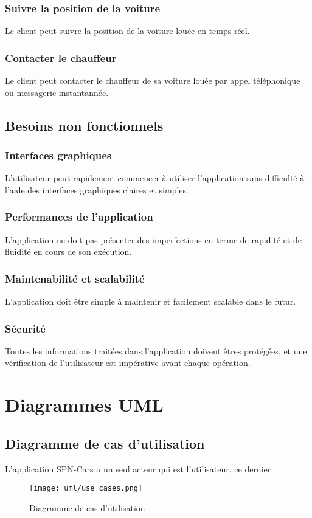 \subsubsection{Suivre la position de la voiture}
Le client peut suivre la position de la voiture louée en temps réel.
\subsubsection{Contacter le chauffeur}
Le client peut contacter le chauffeur de sa voiture louée par appel téléphonique ou messagerie instantannée.
\subsection{Besoins non fonctionnels}
\subsubsection{Interfaces graphiques}
L'utilisateur peut rapidement commencer à utiliser l'application sans difficulté à l'aide des interfaces graphiques claires et simples.
\subsubsection{Performances de l'application}
L'application ne doit pas présenter des imperfections en terme de rapidité et de fluidité en cours de son exécution.
\subsubsection{Maintenabilité et scalabilité}
L'application doit être simple à maintenir et facilement scalable dans le futur.
\subsubsection{Sécurité}
Toutes les informations traitées dans l'application doivent êtres protégées, et une vérification de l'utilisateur est impérative avant chaque opération.
\section{Diagrammes UML}
\subsection{Diagramme de cas d'utilisation}
L'application SPN-Cars a un seul acteur qui est l'utilisateur, ce dernier
\begin{figure}[H]
    \centering
    \texttt{[image: uml/use\_cases.png]}
    \vspace{1cm}
    \captionsetup{justification=centering}

    \caption{Diagramme de cas d'utilisation}
    \label{fig:use_case_diag}
\end{figure}
